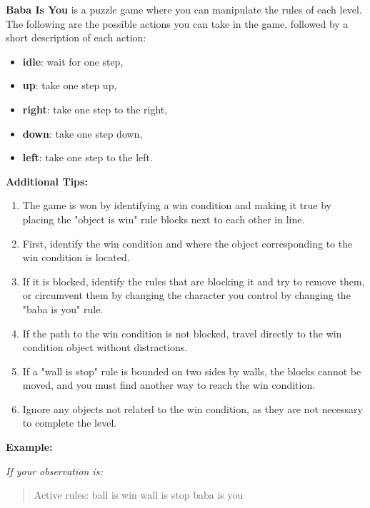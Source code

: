 \begin{GreenBox}[frametitle={\textbf{Iteration 1 Baba-is-ai Prompt}}]
\textbf{Baba Is You} is a puzzle game where you can manipulate the rules of each level. The following are the possible actions you can take in the game, followed by a short description of each action:

\begin{itemize}
    \item \textbf{idle}: wait for one step,
    \item \textbf{up}: take one step up,
    \item \textbf{right}: take one step to the right,
    \item \textbf{down}: take one step down,
    \item \textbf{left}: take one step to the left.
\end{itemize}

\textbf{Additional Tips:}
\begin{enumerate}
    \item The game is won by identifying a win condition and making it true by placing the "object is win" rule blocks next to each other in line.
    \item First, identify the win condition and where the object corresponding to the win condition is located.
    \item If it is blocked, identify the rules that are blocking it and try to remove them, or circumvent them by changing the character you control by changing the "baba is you" rule.
    \item If the path to the win condition is not blocked, travel directly to the win condition object without distractions.
    \item If a "wall is stop" rule is bounded on two sides by walls, the blocks cannot be moved, and you must find another way to reach the win condition.
    \item Ignore any objects not related to the win condition, as they are not necessary to complete the level.
\end{enumerate}

\textbf{Example:}

\textit{If your observation is:}
\begin{quote}
Active rules:  
ball is win  
wall is stop  
baba is you  


\end{quote}
\end{GreenBox}

